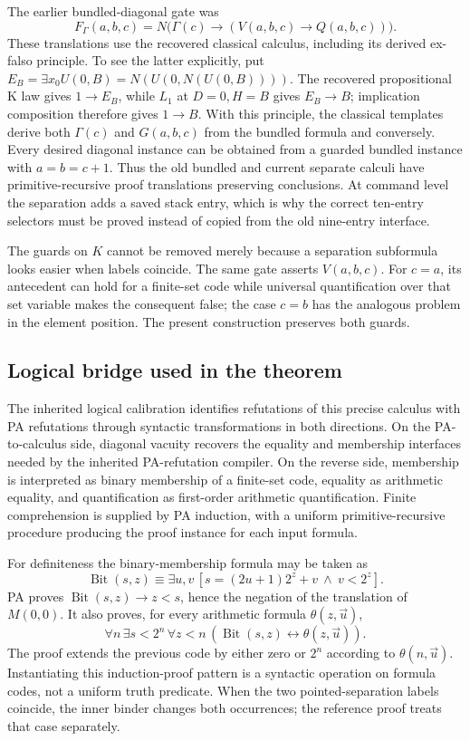 The earlier bundled-diagonal gate was
\[
 F_\Gamma(a,b,c)=N\bigl(\Gamma(c)\to(V(a,b,c)\to Q(a,b,c))\bigr).
\]
These translations use the recovered classical calculus, including its
derived ex-falso principle. To see the latter explicitly, put
$E_B=\exists x_0 U(0,B)=N(U(0,N(U(0,B))))$. The recovered propositional
K law gives $1\to E_B$, while $L_1$ at $D=0,H=B$ gives $E_B\to B$;
implication composition therefore gives $1\to B$. With this principle,
the classical templates derive both $\Gamma(c)$ and $G(a,b,c)$
from the bundled formula and conversely. Every desired diagonal instance can be
obtained from a guarded bundled instance with $a=b=c+1$. Thus the old
bundled and current separate calculi have primitive-recursive proof
translations preserving conclusions. At command level the separation
adds a saved stack entry, which is why the correct ten-entry selectors
must be proved instead of copied from the old nine-entry interface.

The guards on $K$ cannot be removed merely because a separation subformula
looks easier when labels coincide. The same gate asserts
$V(a,b,c)$. For $c=a$, its antecedent can hold for a finite-set code while
universal quantification over that set variable makes the consequent false;
the case $c=b$ has the analogous problem in the element position. The
present construction preserves both guards.

\subsection{Logical bridge used in the theorem}

The inherited logical calibration\cite{pa195,pa194,pa195c} identifies refutations of this precise calculus
with PA refutations through syntactic transformations in both directions.
On the PA-to-calculus side, diagonal vacuity recovers the equality and
membership interfaces needed by the inherited PA-refutation compiler.
On the reverse side, membership is interpreted as binary membership of a
finite-set code, equality as arithmetic equality, and quantification as
first-order arithmetic quantification. Finite comprehension is supplied by
PA induction, with a uniform primitive-recursive procedure producing the
proof instance for each input formula.

For definiteness the binary-membership formula may be taken as
\[
 \operatorname{Bit}(s,z)\equiv
 \exists u,v\,[s=(2u+1)2^z+v\ \wedge\ v<2^z].
\]
PA proves $\operatorname{Bit}(s,z)\to z<s$, hence the negation of the
translation of $M(0,0)$. It also proves, for every arithmetic formula
$\theta(z,\vec u)$,
\[
 \forall n\,\exists s<2^n\,\forall z<n\,
 (\operatorname{Bit}(s,z)\leftrightarrow\theta(z,\vec u)).
\]
The proof extends the previous code by either zero or $2^n$ according to
$\theta(n,\vec u)$. Instantiating this induction-proof pattern is a
syntactic operation on formula codes, not a uniform truth predicate.
When the two pointed-separation labels coincide, the inner binder changes
both occurrences; the reference proof treats that case separately.


